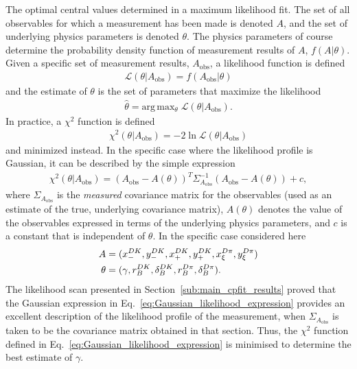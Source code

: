 The optimal central values determined in a maximum likelihood fit. The set of all observables for which a measurement has been made is denoted $A$, and the set of underlying physics parameters is denoted $\theta$. The physics parameters of course determine the probability density function of measurement results of $A$, $f(A|\theta)$. Given a specific set of measurement results, $A_\mathrm{obs}$, a likelihood function is defined
\begin{align}
    \mathcal L (\theta | A_\mathrm{obs}) = f(A_\mathrm{obs}|\theta)
\end{align}
and the estimate of $\theta$ is the set of parameters that maximize the likelihood
\begin{align}
    \hat \theta = \text{arg}\,\text{max}_\theta \; \mathcal L(\theta|A_\mathrm{obs}).
\end{align} In practice, a $\chi^2$ function is defined
\begin{align}
    \chi^2(\theta | A_\mathrm{obs})= -2\ln \mathcal L (\theta | A_\mathrm{obs})
\end{align}
and minimized instead. In the specific case where the likelihood profile is Gaussian, it can be described by the simple expression
\begin{align}\label{eq:Gaussian_likelihood_expression}
    \chi^2(\theta | A_\mathrm{obs}) = \left(A_\mathrm{obs} - A(\theta)\right)^T \Sigma_{A_\mathrm{obs}}^{-1}\left(A_\mathrm{obs} - A(\theta)\right) + c,
\end{align}
where $\Sigma_{A_\mathrm{obs}}$ is the \emph{measured} covariance matrix for the observables (used as an estimate of the true, underlying covariance matrix), $A(\theta)$ denotes the value of the observables expressed in terms of the underlying physics parameters, and $c$ is a constant that is independent of $\theta$. In the specific case considered here
\begin{align}
\begin{split}
        A&=(x_-^{{D}{K}}, y_-^{{D}{K}}, x_+^{{D}{K}}, y_+^{{D}{K}}, x_\xi^{{D}\pi}, y_\xi^{{D}\pi}) \\ 
        \theta &= (\gamma, r_B^{DK}, \delta_B^{DK}, r_B^{{D}\pi}, \delta_B^{{D}\pi}).
\end{split}
\end{align}
The likelihood scan presented in Section~\ref{sub:main_cpfit_results} proved that the Gaussian expression in Eq.~\eqref{eq:Gaussian_likelihood_expression} provides an excellent description of the likelihood profile of the measurement, when $\Sigma_{A_\mathrm{obs}}$ is taken to be the covariance matrix obtained in that section. Thus, the $\chi^2$ function defined in Eq.~\eqref{eq:Gaussian_likelihood_expression} is minimised to determine the best estimate of $\gamma$. 

